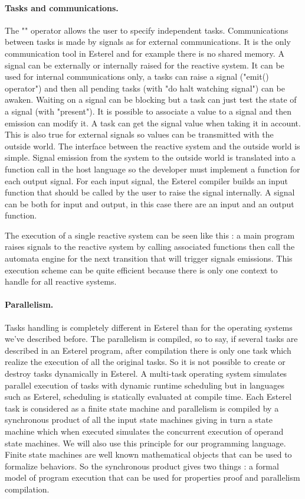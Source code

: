 \documentclass[10pt]{report}
\begin{document}
\paragraph{Tasks and communications.} The "\textbar\textbar" operator allows the user to specify independent tasks. Communications between
tasks is made by signals as for external communications. It is the only communication tool in Esterel and for example there is no
shared memory. A signal can be externally or internally raised for the reactive system. It can be used for internal communications
only, a tasks can raise a signal ("emit() operator") and then all pending tasks (with "do halt watching signal") can be awaken.
Waiting on a signal can be blocking but a task can just test the state of a signal (with "present"). It is possible to
associate a value to a signal and then emission can modify it. A task can get the signal value when taking it in account.
This is also true for external signals so values can be transmitted with the outside world. The interface between the reactive
system and the outside world is simple. Signal emission from the system to the outside world is translated into a function call
in the host language so the developer must implement a function for each output signal. For each input signal, the Esterel
compiler builds an input function that should be called by the user to raise the signal internally. A signal can be both for
input and output, in this case there are an input and an output function.

The execution of a single reactive system can be seen like this : a main program raises signals to the reactive system by
calling associated functions then call the automata engine for the next transition that will trigger signals emissions. This
execution scheme can be quite efficient because there is only one context to handle for all reactive systems.

\paragraph{Parallelism.} Tasks handling is completely different in Esterel than for the operating systems we've described before.
The parallelism is compiled, so to say, if several tasks are described in an Esterel program, after compilation there is only
one task which realize the execution of all the original tasks. So it is not possible to create or destroy tasks dynamically
in Esterel. A multi-task operating system simulates parallel execution of tasks with dynamic runtime scheduling but in languages
such as Esterel, scheduling is statically evaluated at compile time. Each Esterel task is considered as a finite state machine
and parallelism is compiled by a synchronous product of all the input state machines giving in turn a state machine which
when executed simulates the concurrent execution of operand state machines. We will also use this principle for our programming
language. Finite state machines are well known mathematical objects that can be used to formalize behaviors. So the synchronous
product gives two things : a formal model of program execution that can be used for properties proof and parallelism compilation.
\end{document}

